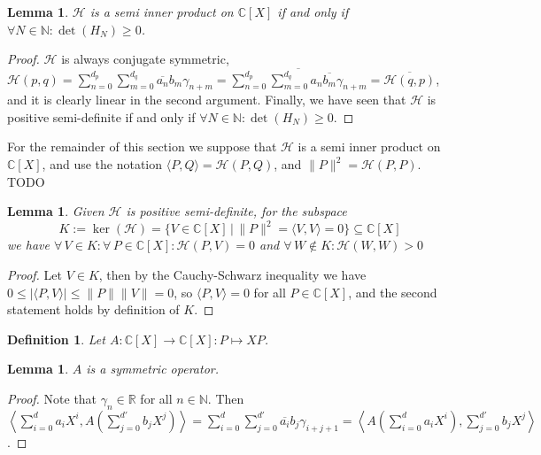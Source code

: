 \documentclass[12pt,oneside]{report}
\newtheorem{lem}[thm]{Lemma}
\newtheorem{defn}[thm]{Definition}
\begin{document}
\begin{lem}
    $\mathcal{H}$ is a semi inner product on $\mathbb{C}[X]$ if and only if $\forall N \in \mathbb{N}: \det(H_{N}) \geq 0$.
\end{lem}
\begin{proof}
    $\mathcal{H}$ is always conjugate symmetric, $\mathcal{H}(p,q) = \sum_{n=0}^{d_{p}}\sum_{m=0}^{d_{q}} \overline{a_{n}}b_{m}\gamma_{n+m} = \overline{\sum_{n=0}^{d_{p}}\sum_{m=0}^{d_{q}} a_{n}\overline{b_{m}}\gamma_{n+m}} = \overline{\mathcal{H}(q,p)}$, and it is clearly linear in the second argument. Finally, we have seen that $\mathcal{H}$ is positive semi-definite if and only if $\forall N \in \mathbb{N}: \det(H_{N}) \geq 0$.
\end{proof}

For the remainder of this section we suppose that $\mathcal{H}$ is a semi inner product on $\mathbb{C}[X]$, and use the notation $\langle P, Q \rangle = \mathcal{H}(P,Q)$, and $\|P\|^{2} = \mathcal{H}(P,P)$. TODO

\begin{lem}
    Given $\mathcal{H}$ is positive semi-definite, for the subspace
    $$K := \ker(\mathcal{H}) = \{ V \in \mathbb{C}[X] \, | \, \|P\|^{2} = \langle V, V \rangle = 0 \} \subseteq \mathbb{C}[X]$$
    we have $\forall \, V \in K: \forall \, P \in \mathbb{C}[X]: \mathcal{H}(P,V) = 0$ and $\forall \, W \notin K: \mathcal{H}(W,W) > 0$
\end{lem}
\begin{proof}
    Let $V \in K$, then by the Cauchy-Schwarz inequality we have $0 \leq |\langle P, V \rangle| \leq \|P\|\|V\| = 0$, so $\langle P, V \rangle = 0$ for all $P \in \mathbb{C}[X]$, and the second statement holds by definition of $K$.
\end{proof}

\begin{defn}
    Let $A: \mathbb{C}[X] \to \mathbb{C}[X]: P \mapsto XP$.
\end{defn}

\begin{lem}
    $A$ is a symmetric operator.
\end{lem}
\begin{proof}
    Note that $\gamma_{n} \in \mathbb{R}$ for all $n \in \mathbb{N}$. Then $\left\langle  \sum_{i=0}^{d}a_{i}X^{i}, A\left(\sum_{j=0}^{d'}b_{j}X^{j}\right) \right\rangle = \sum_{i=0}^{d} \sum_{j=0}^{d'} \overline{a_{i}}b_{j} \gamma_{i+j+1} = \left\langle  A\left(\sum_{i=0}^{d}a_{i}X^{i}\right), \sum_{j=0}^{d'}b_{j}X^{j} \right\rangle$.
\end{proof}
\end{document}
